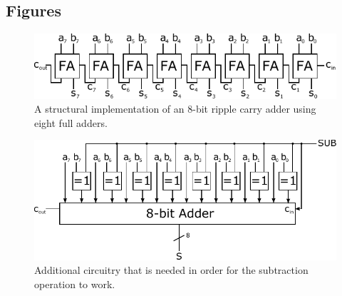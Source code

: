 \documentclass[a4,11pt]{article}
\begin{document}
\newpage
\begin{appendix}

\section{Figures}
\label{app:fig}

\begin{figure}[h!]
 	\centering
	\includegraphics[width=1\columnwidth]{Figurer/rca}
  	\caption{A structural implementation of an 8-bit ripple carry adder using eight full adders.}
  	\label{fig:rca}
\end{figure}

\begin{figure}[h!]
 	\centering
	\includegraphics[width=1\columnwidth]{Figurer/sub}
  	\caption{Additional circuitry that is needed in order for the subtraction
		operation to work.}
  	\label{fig:sub}
\end{figure}

\end{appendix}
\end{document}
